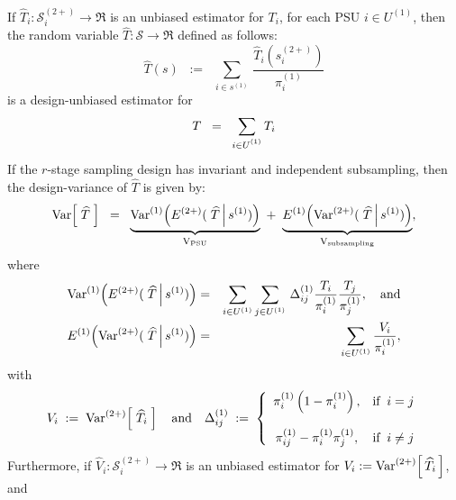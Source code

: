 \begin{theorem}\label{theorem:rStage}
\mbox{}\vskip 0.1cm
\noindent
If $\widehat{T}_{i} : \mathcal{S}^{(2+)}_{i} \longrightarrow \Re$ is an unbiased estimator for $T_{i}$,
for each \textnormal{PSU} $i \in U^{(1)}$,
then the random variable $\widehat{T} : \mathcal{S} \longrightarrow \Re$ defined as follows:
\begin{equation}
\widehat{T}(s)
\;\;:=\;\;
\sum_{i\in s^{(1)}}\,\frac{\widehat{T}_{i}(s^{(2+)}_{i})}{\pi^{(1)}_{i}}
\end{equation}
is a design-unbiased estimator for
\begin{equation*}
T \;\; = \;\; \sum_{i\in U^{(1)}_{\color{white} i}}T_{i}
\end{equation*}
If the $r$-stage sampling design has invariant and independent subsampling,
then the design-variance of $\widehat{T}$ is given by:
\begin{equation}
\textnormal{Var}\!\left[\;\widehat{T}\;\right]
\;\;=\;\;
\underset{\textnormal{V}_{\textnormal{PSU}}}{\underbrace{\textnormal{Var}^{(1)}\!\left(E^{(2+)}(\,\left.\widehat{T}\,\right\vert s^{(1)})\right)}}
\;+\;
\underset{\textnormal{V}_{\textnormal{subsampling}}}{\underbrace{E^{(1)}\!\left(\textnormal{Var}^{(2+)}(\,\left.\widehat{T}\,\right\vert s^{(1)})\right)}},
\end{equation}
where
\begin{eqnarray*}
\textnormal{Var}^{(1)}\!\left(E^{(2+)}(\,\left.\widehat{T}\,\right\vert s^{(1)})\right)
&=&
\sum_{i\in U^{(1)}}\sum_{j\in U^{(1)}}\,\Delta^{(1)}_{ij}\frac{T_{i}}{\pi^{(1)}_{i}}\frac{T_{j}}{\pi^{(1)}_{j}},\quad\textnormal{and}
\\
E^{(1)}\!\left(\textnormal{Var}^{(2+)}(\,\left.\widehat{T}\,\right\vert s^{(1)})\right)
&=&
\sum_{i\in U^{(1)}}\frac{V_{i}}{\pi^{(1)}_{i}},
\end{eqnarray*}
with
\begin{equation}
V_{i} \;:=\; \textnormal{Var}^{(2+)}\!\left[\;\widehat{T}_{i}\;\right]
\quad\textnormal{and}\quad
\Delta^{(1)}_{ij}\;:=\;
\left\{
\begin{array}{cl}
\pi^{(1)}_{i}\left(1 - \pi^{(1)}_{i}\right), & \textnormal{if}\;\; i = j
\\ \\
\pi^{(1)}_{ij} - \pi^{(1)}_{i}\pi^{(1)}_{j}, & \textnormal{if}\;\; i \neq j
\end{array}
\right.
\end{equation}
Furthermore, if $\widehat{V}_{i} : \mathcal{S}^{(2+)}_{i} \longrightarrow \Re$
is an unbiased estimator for
$V_{i} := \textnormal{Var}^{(2+)}\!\left[\,\widehat{T}_{i}\,\right]$, and

\end{theorem}
